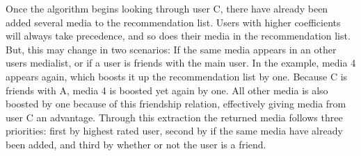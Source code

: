 Once the algorithm begins looking through user C, there have already been added several media to the recommendation list. Users with higher coefficients will always take precedence, and so does their media in the recommendation list. But, this may change in two scenarios: If the same media appears in an other users medialist, or if a user is friends with the main user. In the example, media 4 appears again, which boosts it up the recommendation list by one. Because C is friends with A, media 4 is boosted yet again by one. All other media is also boosted by one because of this friendship relation, effectively giving media from user C an advantage. Through this extraction the returned media follows three priorities: first by highest rated user, second by if the same media have already been added, and third by whether or not the user is a friend.